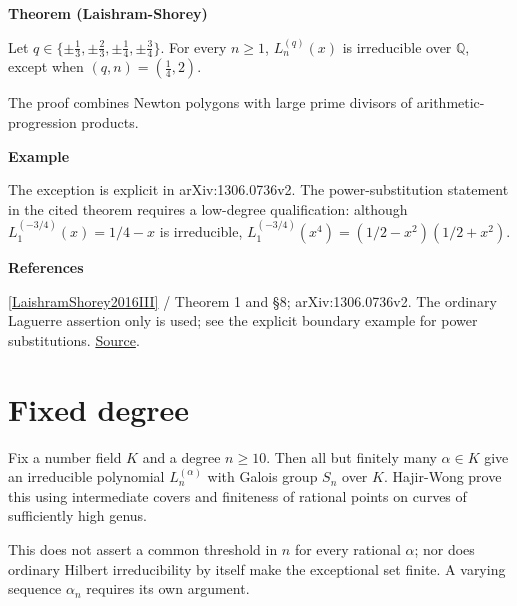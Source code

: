 \documentclass[11pt,a4paper,oneside,openany]{book}
\newcommand{\atlasdisplay}[1]{\par\begingroup\centering\vspace{3pt}\noindent\adjustbox{max width=\linewidth}{\(\displaystyle #1\)}\par\vspace{5pt}\endgroup}
\newenvironment{sources}{\par\smallskip\begingroup\footnotesize\color{atlasgray}\leftskip=10pt\setlength{\parskip}{2pt}}{\par\endgroup\smallskip}
\begin{document}
\begin{atlasblock}[standard]
\textbf{\sffamily Theorem (Laishram-Shorey)}\par\smallskip
\color{black} Let \(q\in\{\pm\tfrac13,\pm\tfrac23,\pm\tfrac14,\pm\tfrac34\}\). For every \(n\ge1\), \(L_n^{(q)}(x)\) is irreducible over \(\mathbb Q\), except when \((q,n)=(\tfrac14,2)\).\par
\end{atlasblock}\color{black}
\color{black} The proof combines Newton polygons with large prime divisors of arithmetic-progression products.\par

\begin{atlasblock}[standard]
\textbf{\sffamily Example}\par\smallskip

\atlasdisplay{L_2^{(1/4)}(x)=\frac{(4x-3)(4x-15)}{32}.}
\color{black} The exception is explicit in arXiv:1306.0736v2. The power-substitution statement in the cited theorem requires a low-degree qualification: although \(L_1^{(-3/4)}(x)=1/4-x\) is irreducible, \(L_1^{(-3/4)}(x^4)=(1/2-x^2)(1/2+x^2)\).\par
\end{atlasblock}\color{black}
\begin{sources}
\textbf{References}\par\smallskip
\noindent\hyperlink{ref:LaishramShorey2016III}{[LaishramShorey2016III]} / Theorem 1 and §8; arXiv:1306.0736v2. The ordinary Laguerre assertion only is used; see the explicit boundary example for power substitutions. \href{https://doi.org/10.1016/j.jnt.2016.01.003}{Source}.\par
\end{sources}\color{black}
\section{Fixed degree}
\color{black} Fix a number field \(K\) and a degree \(n\ge10\). Then all but finitely many \(\alpha\in K\) give an irreducible polynomial \(L_n^{(\alpha)}\) with Galois group \(S_n\) over \(K\). Hajir-Wong prove this using intermediate covers and finiteness of rational points on curves of sufficiently high genus.\par
\color{black} This does not assert a common threshold in \(n\) for every rational \(\alpha\); nor does ordinary Hilbert irreducibility by itself make the exceptional set finite. A varying sequence \(\alpha_n\) requires its own argument.\par
\end{document}
